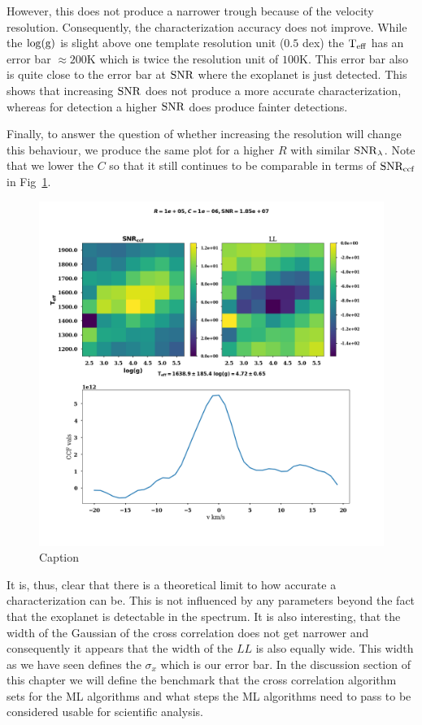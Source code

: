 However, this does not produce a narrower trough because of the velocity resolution. 
Consequently, the characterization accuracy does not improve. 
While the $\log(\rm{g})$ is slight above one template resolution unit ($0.5$ dex) the $\rm{T_{eff}}$ has an error bar $\approx 200$K which is twice the resolution unit of $100$K. 
This error bar also is quite close to the error bar at $\rm{SNR}$ where the exoplanet is just detected.
This shows that increasing $\rm{SNR}$ does not produce a more accurate characterization, whereas for detection a higher $\rm{SNR}$ does produce fainter detections.

Finally, to answer the question of whether increasing the resolution will change this behaviour, we produce the same plot for a higher $R$ with similar $\rm{SNR}_{\lambda}$.
Note that we lower the $C$ so that it still continues to be comparable in terms of $\rm{SNR_{ccf}}$ in Fig~\ref{fig:highres-charmat}.
\begin{figure}[!ht]
    \centering
    \includegraphics[scale=0.3]{images/Chapter3/char_plots_1e+05_1e-06_1.85e+07.png}
    \caption{Caption}
    \label{fig:highres-charmat}
\end{figure}
It is, thus, clear that there is a theoretical limit to how accurate a characterization can be.
This is not influenced by any parameters beyond the fact that the exoplanet is detectable in the spectrum.
It is also interesting, that the width of the Gaussian of the cross correlation does not get narrower and consequently it appears that the width of the $LL$ is also equally wide.
This width as we have seen defines the $\sigma_x$ which is our error bar.
In the discussion section of this chapter we will define the benchmark that the cross correlation algorithm sets for the ML algorithms and what steps the ML algorithms need to pass to be considered usable for scientific analysis.

